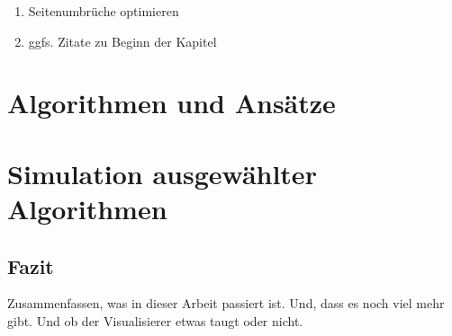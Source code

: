 
\listfiles


\listoftodos

\begin{enumerate}
	\item Seitenumbrüche optimieren
	\item ggfs. Zitate zu Beginn der Kapitel
\end{enumerate}



\cleardoublepage

\setcounter{page}{1}
\pagestyle{maincontentstyle}


\part{Algorithmen und Ansätze}






\part{Simulation ausgewählter Algorithmen}

\cleardoublepage

\chapter{Fazit}
Zusammenfassen, was in dieser Arbeit passiert ist.
Und, dass es noch viel mehr gibt.
Und ob der Visualisierer etwas taugt oder nicht.




